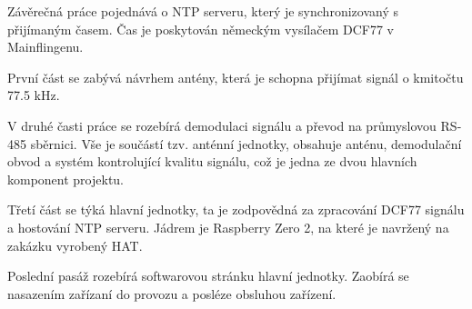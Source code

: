 Závěrečná práce pojednává o NTP serveru, který je synchronizovaný s přijímaným časem. Čas
je poskytován německým vysílačem DCF77 v Mainflingenu.

První část se zabývá návrhem antény, která je schopna přijímat signál o kmitočtu 77.5 kHz.

V druhé časti práce se rozebírá demodulaci signálu a převod na průmyslovou RS-485
sběrnici. Vše je součástí tzv. anténní jednotky, obsahuje anténu, demodulační obvod a systém kontrolující kvalitu
signálu, což je jedna ze dvou hlavních komponent projektu.

Třetí část se týká hlavní jednotky, ta je zodpovědná za zpracování DCF77 signálu a
hostování NTP serveru. Jádrem je Raspberry Zero 2, na které je navržený na zakázku
vyrobený HAT.

Poslední pasáž rozebírá softwarovou stránku hlavní jednotky. Zaobírá se nasazením zařízaní
do provozu a posléze obsluhou zařízení.
